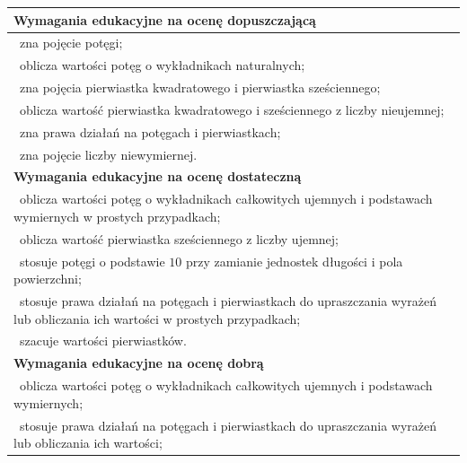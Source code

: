 \documentclass[12pt,a4paper]{article}
\begin{document}
	\begin{longtable}{|p{16cm}|}
		\hline
		
		\textbf{Wymagania edukacyjne na ocenę dopuszczającą} \\ \hline
		
		\textbullet\ zna pojęcie potęgi; \\
		
		\textbullet\ oblicza wartości potęg o wykładnikach naturalnych; \\
		
		\textbullet\ zna pojęcia pierwiastka kwadratowego i pierwiastka sześciennego; \\
		
		\textbullet\ oblicza wartość pierwiastka kwadratowego i sześciennego z liczby nieujemnej; \\
		
		\textbullet\ zna prawa działań na potęgach i pierwiastkach; \\
		
		\textbullet\ zna pojęcie liczby niewymiernej. \\ \hline
		
		\textbf{Wymagania edukacyjne na ocenę dostateczną} \\ \hline
		
		\textbullet\ oblicza wartości potęg o wykładnikach całkowitych ujemnych i podstawach wymiernych w prostych przypadkach; \\
		
		\textbullet\ oblicza wartość pierwiastka sześciennego z liczby ujemnej; \\
		
		\textbullet\ stosuje potęgi o podstawie $10$ przy zamianie jednostek długości i pola powierzchni; \\
		
		\textbullet\ stosuje prawa działań na potęgach i pierwiastkach do upraszczania wyrażeń lub obliczania ich wartości w prostych przypadkach; \\
		
		\textbullet\ szacuje wartości pierwiastków. \\ \hline
		
		\textbf{Wymagania edukacyjne na ocenę dobrą} \\ \hline
		
		\textbullet\ oblicza wartości potęg o wykładnikach całkowitych ujemnych i podstawach wymiernych; \\
		
		\textbullet\ stosuje prawa działań na potęgach i pierwiastkach do upraszczania wyrażeń lub obliczania ich wartości; \\
		

\end{longtable}
\end{document}
